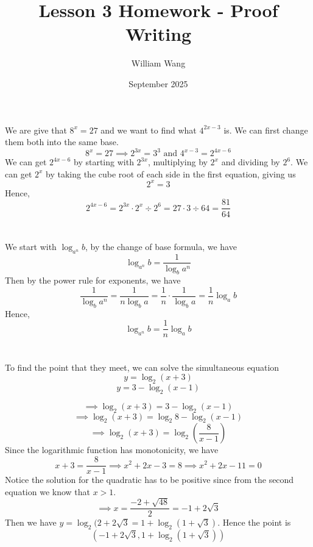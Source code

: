 \documentclass{article}
\title{Lesson 3 Homework - Proof Writing}
\author{William Wang}
\date{September 2025}
\begin{document}
\maketitle

\section{}
We are give that \(8^x = 27\) and we want to find what \(4^{2x-3}\) is. We can first change them both into the same base.
\[8^x = 27 \implies 2^{3x} = 3^3 \text{ and } 4^{x-3} = 2^{4x-6}\]
We can get \( 2^{4x-6}\) by starting with \(2^{3x}\), multiplying by \(2^x\) and dividing by \(2^6\). We can get \(2^x\) by taking the cube root of each side in the first equation, giving us
\[2^x = 3\] Hence, 
\[2^{4x-6 }= 2^{3x} \cdot 2^{x}  \div 2^6  = 27 \cdot 3 \div 64 = \frac{81}{64}\]
\section{}
We start with \(\log_{a^n}b\), by the change of base formula, we have 
\[\log_{a^n} b = \frac{1}{\log_b a^n}\]
Then by the power rule for exponents, we have
\[\frac{1}{\log_b a^n} = \frac{1}{n\log_b a} = \frac{1}{n}\cdot \frac{1}{\log_b a} = \frac{1}{n} \log_a b\]
Hence, 
\[\log_{a^n} b = \frac{1}{n} \log_a b\]
\section{}
To find the point that they meet, we can solve the simultaneous equation
\[y = \log_2 (x+3)\]
\[y = 3-\log_2 (x-1)\]

\[\implies \log_2(x+3) = 3-\log_2(x-1)\]
\[\implies \log_2(x+3) = \log_2 8 - \log_2(x-1)\]
\[\implies \log_2(x+3)=\log_2(\frac{8}{x-1})\]
Since the logarithmic function has monotonicity, we have
\[x+3 = \frac{8}{x-1} \implies x^2+2x-3 = 8 \implies x^2+2x-11 = 0\]
Notice the solution for the quadratic has to be positive since from the second equation we know that \(x > 1\). 
\[\implies x = \frac{-2+\sqrt{48}}{2} = -1 + 2\sqrt{3}\]
Then we have $y = \log_2(2+2\sqrt{3} = 1 + \log_2 (1+\sqrt{3})$. Hence the point is 
\[(-1+2\sqrt{3}, 1+\log_2(1+\sqrt{3}))\]
\end{document}
